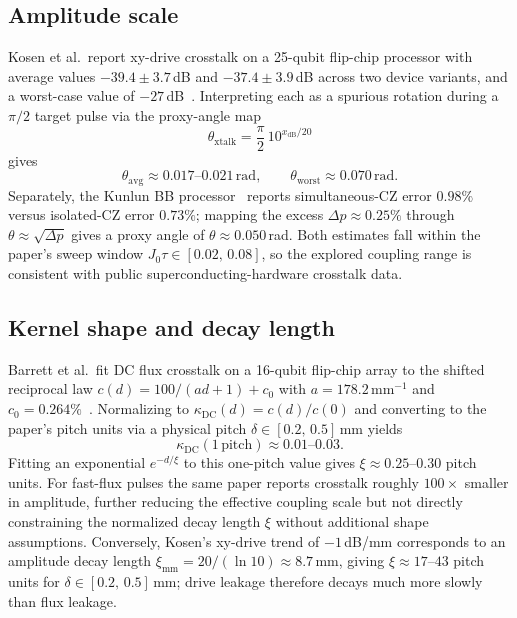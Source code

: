 \documentclass[
aps,
prx,
10pt,
twocolumn,
groupedaddress,
longbibliography,
nofootinbib,
floatfix
]{revtex4-2}
\theoremstyle{definition}
\begin{document}
\subsection{Amplitude scale}

Kosen et al.\ report xy-drive crosstalk on a 25-qubit flip-chip processor with average values $-39.4\pm 3.7$\,dB and $-37.4\pm 3.9$\,dB across two device variants, and a worst-case value of $-27$\,dB~\cite{kosen_crosstalk_2024}. Interpreting each as a spurious rotation during a $\pi/2$ target pulse via the proxy-angle map
\begin{equation}
\theta_{\mathrm{xtalk}}=\frac{\pi}{2}\,10^{x_{\mathrm{dB}}/20}
\end{equation}
gives
\begin{equation}
\theta_{\mathrm{avg}}\approx 0.017\text{--}0.021\,\mathrm{rad},
\qquad
\theta_{\mathrm{worst}}\approx 0.070\,\mathrm{rad}.
\end{equation}
Separately, the Kunlun BB processor~\cite{wang_demo_2025} reports simultaneous-CZ error $0.98\%$ versus isolated-CZ error $0.73\%$; mapping the excess $\Delta p\approx 0.25\%$ through $\theta\approx\sqrt{\Delta p}$ gives a proxy angle of $\theta\approx 0.050$\,rad. Both estimates fall within the paper's sweep window $J_0\tau\in[0.02,\,0.08]$, so the explored coupling range is consistent with public superconducting-hardware crosstalk data.

\subsection{Kernel shape and decay length}

Barrett et al.\ fit DC flux crosstalk on a 16-qubit flip-chip array to the shifted reciprocal law $c(d)=100/(ad+1)+c_0$ with $a=178.2$\,mm$^{-1}$ and $c_0=0.264\%$~\cite{barrett_flux_2023}. Normalizing to $\kappa_{\mathrm{DC}}(d)=c(d)/c(0)$ and converting to the paper's pitch units via a physical pitch $\delta\in[0.2,\,0.5]$\,mm yields
\begin{equation}
\kappa_{\mathrm{DC}}(1\,\text{pitch})\approx 0.01\text{--}0.03.
\end{equation}
Fitting an exponential $e^{-d/\xi}$ to this one-pitch value gives $\xi\approx 0.25$--$0.30$ pitch units. For fast-flux pulses the same paper reports crosstalk roughly $100\times$ smaller in amplitude, further reducing the effective coupling scale but not directly constraining the normalized decay length $\xi$ without additional shape assumptions. Conversely, Kosen's xy-drive trend of $-1$\,dB/mm corresponds to an amplitude decay length $\xi_{\mathrm{mm}}=20/({\ln 10})\approx 8.7$\,mm, giving $\xi\approx 17$--$43$ pitch units for $\delta\in[0.2,\,0.5]$\,mm; drive leakage therefore decays much more slowly than flux leakage.
\end{document}
